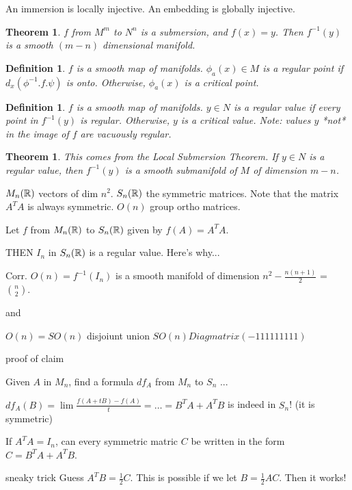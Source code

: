 \documentclass[11pt,leqno,oneside]{amsart}
\theoremstyle{mystyle} \newtheorem{thrm}[thm]{Theorem}
\theoremstyle{mystyle} \newtheorem{defi}[thm]{Definition}
\begin{document}
An immersion is locally injective.  An embedding is globally injective.

\begin{thrm}
	$f$ from $M^m$ to $N^n$ is a submersion, and $f(x) = y$.  Then $f^{-1}(y)$ is a smooth $(m-n)$ dimensional manifold.
\end{thrm}

\begin{defi}
	$f$ is a smooth map of manifolds.
	$\phi_a(x) \in M$ is a \emph{regular} point if $d_x(\phi^{-1}.f.\psi)$ is onto.  Otherwise, $\phi_a(x)$ is a \emph{critical} point.
\end{defi}

\begin{defi}
	$f$ is a smooth map of manifolds.
	$y \in N$ is a \emph{regular} value if every point in $f^{-1}(y)$ is regular.  Otherwise, $y$ is a \emph{critical} value.  Note: values $y$ *not* in the image of $f$ are vacuously regular.
\end{defi}

\begin{thrm}
	This comes from the Local Submersion Theorem.  If $y \in N$ is a regular value, then $f^{-1}(y)$ is a smooth submanifold of $M$ of dimension $m-n$.
\end{thrm}

\begin{example}
	$M_n({\mathbb R})$ vectors of dim $n^2$.  $S_n({\mathbb R})$ the symmetric matrices.  Note that the matrix $A^T A$ is always symmetric.  $O(n)$ group ortho matrices.

	Let $f$ from $M_n({\mathbb R})$ to $S_n({\mathbb R})$ given by $f(A) = A^T A$.

	THEN $I_n$ in $S_n({\mathbb R})$ is a regular value.  Here's why...

	Corr. $O(n) = f^{-1}(I_n)$ is a smooth manifold of dimension $n^2 - \frac{n(n+1)}{2}$ = $\binom n2$.

	and

	$O(n) = SO(n)$ disjoiunt union $SO(n)Diagmatrix(-1 1 1 1 1 1 1 1 1)$

	proof of claim

	Given $A$ in $M_n$, find a formula $df_A$ from $M_n$ to $S_n$ ...

	$df_A(B) = \lim \frac{f(A+tB) - f(A)}{t} = \ldots = B^T A + A^T B$
	is indeed in $S_n$! (it is symmetric)

	If $A^T A = I_n$, can every symmetric matric $C$ be written in the form $C = B^T A + A^T B$.

	sneaky trick
	Guess $A^T B = \frac12 C$.
	This is possible if we let $B = \frac12 AC$.
	Then it works!
\end{example}
\end{document}
